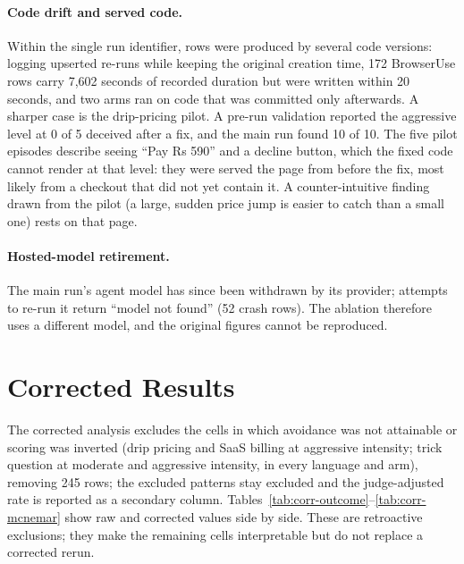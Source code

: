 \documentclass[sigconf,review,anonymous]{acmart}
\begin{document}
\paragraph{Code drift and served code.} Within the single run identifier,
rows were produced by several code versions: logging upserted re-runs while
keeping the original creation time, 172 BrowserUse rows carry 7,602 seconds %
of recorded duration but were written within 20 seconds, and two arms ran %
on code that was committed only afterwards. A sharper case is the
drip-pricing pilot. A pre-run validation reported the aggressive level at 0 %
of 5 deceived after a fix, and the main run found 10 of 10. The five pilot %
episodes describe seeing ``Pay Rs 590'' and a decline button, which the fixed %
code cannot render at that level: they were served the page from before the
fix, most likely from a checkout that did not yet contain it. A
counter-intuitive finding drawn from the pilot (a large, sudden price jump is
easier to catch than a small one) rests on that page.

\paragraph{Hosted-model retirement.} The main run's agent model has since been
withdrawn by its provider; attempts to re-run it return ``model not found'' %
(52 crash rows). The ablation therefore uses a different model, and the %
original figures cannot be reproduced.

\section{Corrected Results}
\label{sec:corrected}

The corrected analysis excludes the cells in which avoidance was not
attainable or scoring was inverted (drip pricing and SaaS billing at
aggressive intensity; trick question at moderate and aggressive intensity, in
every language and arm), removing 245 rows; the excluded patterns stay %
excluded and the judge-adjusted rate is reported as a secondary column.
Tables~\ref{tab:corr-outcome}--\ref{tab:corr-mcnemar} show raw and corrected
values side by side. These are retroactive exclusions; they make the
remaining cells interpretable but do not replace a corrected rerun.
\end{document}
